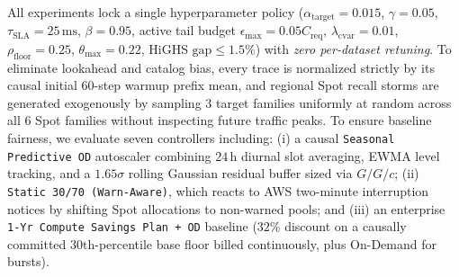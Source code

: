 \documentclass[journal]{IEEEtran}
\begin{document}
All experiments lock a single hyperparameter policy ($\alpha_{\mathrm{target}} = 0.015$, $\gamma = 0.05$, $\tau_{\mathrm{SLA}} = 25\,\mathrm{ms}$, $\beta = 0.95$, active tail budget $\epsilon_{\max} = 0.05 C_{\mathrm{req}}$, $\lambda_{\mathrm{cvar}} = 0.01$, $\rho_{\mathrm{floor}} = 0.25$, $\theta_{\max} = 0.22$, HiGHS $\text{gap} \le 1.5\%$) with \emph{zero per-dataset retuning}. To eliminate lookahead and catalog bias, every trace is normalized strictly by its causal initial $60$-step warmup prefix mean, and regional Spot recall storms are generated exogenously by sampling $3$ target families uniformly at random across all $6$ Spot families without inspecting future traffic peaks. To ensure baseline fairness, we evaluate seven controllers including: (i) a causal \texttt{Seasonal Predictive OD} autoscaler combining $24\,\mathrm{h}$ diurnal slot averaging, EWMA level tracking, and a $1.65\sigma$ rolling Gaussian residual buffer sized via $G/G/c$; (ii) \texttt{Static 30/70 (Warn-Aware)}, which reacts to AWS two-minute interruption notices by shifting Spot allocations to non-warned pools; and (iii) an enterprise \texttt{1-Yr Compute Savings Plan + OD} baseline ($32\%$ discount on a causally committed $30\text{th}$-percentile base floor billed continuously, plus On-Demand for bursts).
\end{document}
